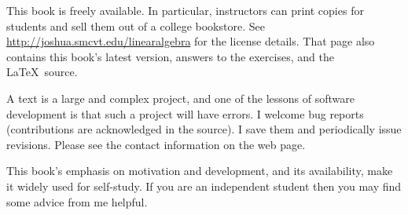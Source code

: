 {\medskip
{}
This book is freely available.
In particular, instructors can print copies for students 
and sell them out of a college bookstore.
See 
\url{http://joshua.smcvt.edu/linearalgebra}
for the license details.
That page also contains this book's latest version,
answers to the exercises, and the \LaTeX\ source.

A text is a large and complex project, and one of the lessons of software
development is that such a project will have errors.
I welcome bug reports
(contributions are acknowledged in the source).
I save them and periodically issue revisions.
Please see the contact information on the web page.


\newcommand{\classday}[1]{\textsc{#1}}
\newcommand{\colwidth}{1.25in}

\medskip
{}
%
This book's emphasis on motivation and development,
and its availability, make it widely used for self-study.
If you are an independent student 
then you may find some advice from me helpful.

}
